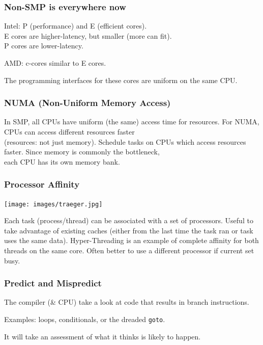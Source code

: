\begin{frame}
  \frametitle{Non-SMP is everywhere now}

  Intel: P (performance) and E (efficient cores). \\
  E cores are higher-latency, but smaller (more can fit).\\
  P cores are lower-latency.\\ \vfill

  AMD: c-cores similar to E cores.\\ \vfill

  The programming interfaces for these cores are uniform on the same CPU.
\end{frame}

\begin{frame}
  \frametitle{NUMA (Non-Uniform Memory Access)}


    In SMP, all CPUs have uniform (the same) access time for resources.
    \vfill
    For NUMA, CPUs can access different resources faster \\
    \qquad (resources: not just memory).
    \vfill
    Schedule tasks on CPUs which access resources faster.
    \vfill
    Since memory is commonly the bottleneck,\\
     \qquad each CPU has its own memory bank.

\end{frame}

\begin{frame}
  \frametitle{Processor Affinity}

\begin{center}
	\texttt{[image: images/traeger.jpg]}
\end{center}

    Each task (process/thread) can be associated with a set of processors.
    \vfill
    Useful to take advantage of existing caches (either from the last time
          the task ran or task uses the same data).
    \vfill
    Hyper-Threading is an example of complete affinity for both threads on
          the same core.
    \vfill
    Often better to use a different processor if current set busy.

\end{frame}



\begin{frame}
\frametitle{Predict and Mispredict}
The compiler (\& CPU) take a look at code that results in branch instructions.

Examples: loops, conditionals, or the dreaded \texttt{goto}.

It will take an assessment of what it thinks is likely to happen. 

\end{frame}



